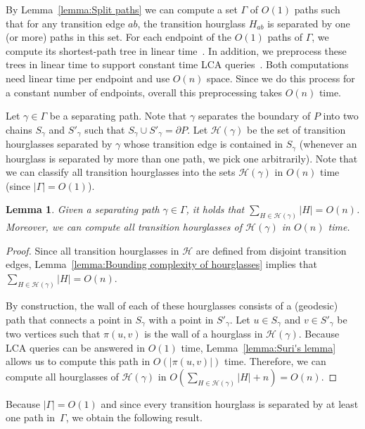 \documentclass[a4paper]{article}
\newtheorem{lemma}[theorem]{Lemma}
\newcommand{\p}[2]{\ensuremath{\pi(#1, #2)}}
\begin{document}
By Lemma~\ref{lemma:Split paths} we can compute a set $\Gamma$ of $O(1)$ paths such that for any transition edge $ab$, the transition hourglass $H_{ab}$ is separated by one (or more) paths in this set. For each endpoint of the $O(1)$ paths of $\Gamma$, we compute its shortest-path tree in linear time~\cite{chazelle1991triangulating,guibasShortestPathTree}. In addition, we preprocess these trees in linear time to support constant time LCA queries~\cite{harel1984fast}. Both computations need linear time per endpoint and use $O(n)$ space. Since we do this process for a constant number of endpoints, overall this preprocessing takes $O(n)$ time. 

Let $\gamma\in \Gamma$ be a separating path. Note that $\gamma$ separates the boundary of $P$ into two chains $S_\gamma$ and $S'_\gamma$ such that $S_\gamma\cup S'_\gamma = \partial P$.
Let $\mathcal H(\gamma)$ be the set of transition hourglasses separated by $\gamma$ whose transition edge is contained in $S_\gamma$ (whenever an hourglass is separated by more than one path, we pick one arbitrarily). Note that we can classify all transition hourglasses into the sets $\mathcal H(\gamma)$ in $O(n)$ time (since $|\Gamma| = O(1)$).

\begin{lemma}
Given a separating path $\gamma\in \Gamma$, it holds that $\sum_{H\in \mathcal H(\gamma)} |H| = O(n)$. Moreover, we can compute all transition hourglasses of $\mathcal H(\gamma)$ in $O(n)$ time.
\end{lemma}
\begin{proof}
Since all transition hourglasses in $\mathcal H$ are defined from disjoint transition edges,
Lemma~\ref{lemma:Bounding complexity of hourglasses} implies that $\sum_{H\in \mathcal H(\gamma)} |H| = O(n)$.

By construction, the wall of each of these hourglasses consists of a (geodesic) path that connects a point in $S_\gamma$ with a point in $S'_\gamma$. Let $u\in S_\gamma$ and $v\in S'_\gamma$ be two vertices such that $\p{u}{v}$ is the wall of a hourglass in $\mathcal H(\gamma)$.
Because LCA queries can be answered in $O(1)$ time, 
Lemma~\ref{lemma:Suri's lemma} allows us to compute this path in $O(|\p{u}{v}|)$ time. 
Therefore, we can compute all hourglasses of $\mathcal H(\gamma)$ in $O(\sum_{H\in \mathcal H(\gamma)} |H| + n) = O(n)$. 
\end{proof}

Because  $|\Gamma| = O(1)$ and since every transition hourglass is separated by at least one path in~$\Gamma$, we obtain the following result.
\end{document}
